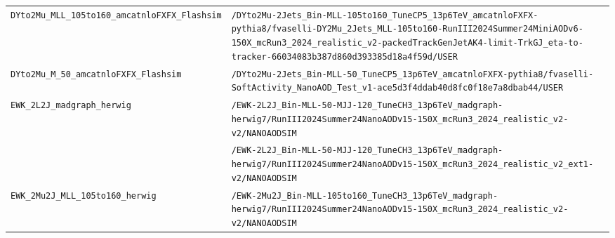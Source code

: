 \begin{longtable}{@{}>{\RaggedRight\arraybackslash}p{} >{\RaggedRight\arraybackslash}p{}@{}}
\addlinespace[2pt]
\texttt{DYto2Mu\_\allowbreak{}MLL\_\allowbreak{}105to160\_\allowbreak{}amcatnloFXFX\_\allowbreak{}Flashsim} & \texttt{/\allowbreak{}DYto2Mu-\allowbreak{}2Jets\_\allowbreak{}Bin-\allowbreak{}MLL-\allowbreak{}105to160\_\allowbreak{}TuneCP5\_\allowbreak{}13p6TeV\_\allowbreak{}amcatnloFXFX-\allowbreak{}pythia8/\allowbreak{}fvaselli-\allowbreak{}DY2Mu\_\allowbreak{}2Jets\_\allowbreak{}MLL-\allowbreak{}105to160-\allowbreak{}RunIII2024Summer24MiniAODv6-\allowbreak{}150X\_\allowbreak{}mcRun3\_\allowbreak{}2024\_\allowbreak{}realistic\_\allowbreak{}v2-\allowbreak{}packedTrackGenJetAK4-\allowbreak{}limit-\allowbreak{}TrkGJ\_\allowbreak{}eta-\allowbreak{}to-\allowbreak{}tracker-\allowbreak{}66034083b387d860d393385d18a4f59d/\allowbreak{}USER} \\
\addlinespace[2pt]
\texttt{DYto2Mu\_\allowbreak{}M\_\allowbreak{}50\_\allowbreak{}amcatnloFXFX\_\allowbreak{}Flashsim} & \texttt{/\allowbreak{}DYto2Mu-\allowbreak{}2Jets\_\allowbreak{}Bin-\allowbreak{}MLL-\allowbreak{}50\_\allowbreak{}TuneCP5\_\allowbreak{}13p6TeV\_\allowbreak{}amcatnloFXFX-\allowbreak{}pythia8/\allowbreak{}fvaselli-\allowbreak{}SoftActivity\_\allowbreak{}NanoAOD\_\allowbreak{}Test\_\allowbreak{}v1-\allowbreak{}ace5d3f4ddab40d8fc0f18e7a8dbab44/\allowbreak{}USER} \\
\addlinespace[2pt]
\texttt{EWK\_\allowbreak{}2L2J\_\allowbreak{}madgraph\_\allowbreak{}herwig} & \texttt{/\allowbreak{}EWK-\allowbreak{}2L2J\_\allowbreak{}Bin-\allowbreak{}MLL-\allowbreak{}50-\allowbreak{}MJJ-\allowbreak{}120\_\allowbreak{}TuneCH3\_\allowbreak{}13p6TeV\_\allowbreak{}madgraph-\allowbreak{}herwig7/\allowbreak{}RunIII2024Summer24NanoAODv15-\allowbreak{}150X\_\allowbreak{}mcRun3\_\allowbreak{}2024\_\allowbreak{}realistic\_\allowbreak{}v2-\allowbreak{}v2/\allowbreak{}NANOAODSIM} \\
 & \texttt{/\allowbreak{}EWK-\allowbreak{}2L2J\_\allowbreak{}Bin-\allowbreak{}MLL-\allowbreak{}50-\allowbreak{}MJJ-\allowbreak{}120\_\allowbreak{}TuneCH3\_\allowbreak{}13p6TeV\_\allowbreak{}madgraph-\allowbreak{}herwig7/\allowbreak{}RunIII2024Summer24NanoAODv15-\allowbreak{}150X\_\allowbreak{}mcRun3\_\allowbreak{}2024\_\allowbreak{}realistic\_\allowbreak{}v2\_\allowbreak{}ext1-\allowbreak{}v2/\allowbreak{}NANOAODSIM} \\
\addlinespace[2pt]
\texttt{EWK\_\allowbreak{}2Mu2J\_\allowbreak{}MLL\_\allowbreak{}105to160\_\allowbreak{}herwig} & \texttt{/\allowbreak{}EWK-\allowbreak{}2Mu2J\_\allowbreak{}Bin-\allowbreak{}MLL-\allowbreak{}105to160\_\allowbreak{}TuneCH3\_\allowbreak{}13p6TeV\_\allowbreak{}madgraph-\allowbreak{}herwig7/\allowbreak{}RunIII2024Summer24NanoAODv15-\allowbreak{}150X\_\allowbreak{}mcRun3\_\allowbreak{}2024\_\allowbreak{}realistic\_\allowbreak{}v2-\allowbreak{}v2/\allowbreak{}NANOAODSIM} \\

\end{longtable}
